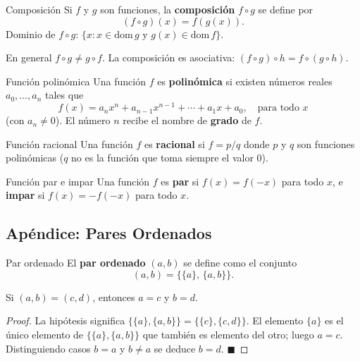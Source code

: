 \documentclass[12pt]{article}
\begin{document}
\begin{definicion}[]{Composición}
Si $f$ y $g$ son funciones, la \textbf{composición} $f \circ g$ se define por
\[ (f \circ g)(x) = f(g(x)). \]
Dominio de $f \circ g$: $\{x : x \in \text{dom}\, g \text{ y } g(x) \in \text{dom}\, f\}$.
\end{definicion}

\begin{nota}[]{}
En general $f \circ g \neq g \circ f$. La composición es asociativa: $(f \circ g) \circ h = f \circ (g \circ h)$.
\end{nota}

\begin{definicion}[]{Función polinómica}
Una función $f$ es \textbf{polinómica} si existen números reales $a_0, \ldots, a_n$ tales que
\[ f(x) = a_n x^n + a_{n-1} x^{n-1} + \cdots + a_1 x + a_0, \quad \text{para todo } x \]
(con $a_n \neq 0$). El número $n$ recibe el nombre de \textbf{grado} de $f$.
\end{definicion}

\begin{definicion}[]{Función racional}
Una función $f$ es \textbf{racional} si $f = p/q$ donde $p$ y $q$ son funciones polinómicas ($q$ no es la función que toma siempre el valor 0).
\end{definicion}

\begin{definicion}[]{Función par e impar}
Una función $f$ es \textbf{par} si $f(x) = f(-x)$ para todo $x$, e \textbf{impar} si $f(x) = -f(-x)$ para todo $x$.
\end{definicion}

\subsection{Apéndice: Pares Ordenados}

\begin{definicion}[]{Par ordenado}
El \textbf{par ordenado} $(a, b)$ se define como el conjunto
\[ (a, b) = \bigl\{\{a\},\, \{a, b\}\bigr\}. \]
\end{definicion}

\begin{teorema}[]{}
Si $(a, b) = (c, d)$, entonces $a = c$ y $b = d$.
\end{teorema}

\begin{proof}
La hipótesis significa $\{\{a\}, \{a,b\}\} = \{\{c\}, \{c,d\}\}$. El elemento $\{a\}$ es el único elemento de $\{\{a\},\{a,b\}\}$ que también es elemento del otro; luego $a = c$. Distinguiendo casos $b = a$ y $b \neq a$ se deduce $b = d$.
$\blacksquare$
\end{proof}
\end{document}
